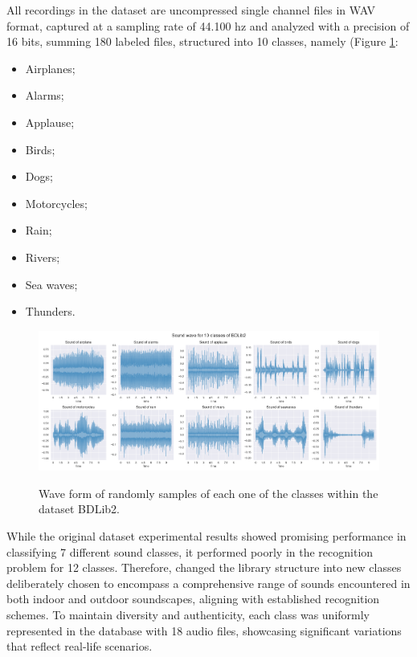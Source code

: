 All recordings in the dataset are uncompressed single channel files in WAV format, captured at a sampling rate of 44.100 \gls{hz} and analyzed with a precision of 16 bits, summing 180 labeled files, structured into 10 classes, namely (Figure \ref{fig:methods_dataset_BDLib2}:
\begin{itemize}
    \item Airplanes;
    \item Alarms;
    \item Applause;
    \item Birds;
    \item Dogs; 
    \item Motorcycles;
    \item Rain;
    \item Rivers;
    \item Sea waves;
    \item Thunders. 
\end{itemize}

\begin{figure}[htbp]
    \raggedright
        \caption{Wave form of randomly samples of each one of the classes within the dataset BDLib2.}
        \includegraphics[width=1\textwidth]{resources/images/050-methods/Methods_dataset_BDLib2.png}
        \label{fig:methods_dataset_BDLib2}
\end{figure}

While the original dataset experimental results \cite{Bountourakis2015} showed promising performance in classifying 7 different sound classes, it performed poorly in the recognition problem for 12 classes. Therefore, \textcite{Bountourakis2019} changed the library structure into new classes deliberately chosen to encompass a comprehensive range of sounds encountered in both indoor and outdoor soundscapes, aligning with established recognition schemes. To maintain diversity and authenticity, each class was uniformly represented in the database with 18 audio files, showcasing significant variations that reflect real-life scenarios.

